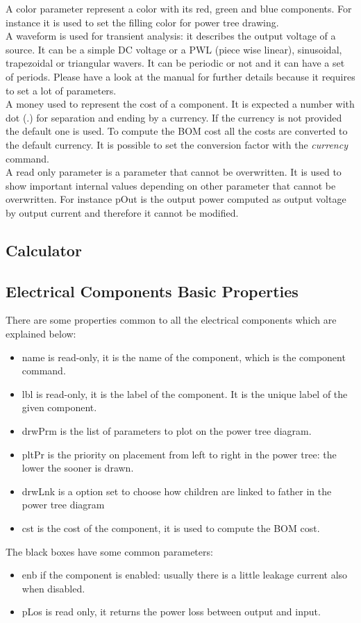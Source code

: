 \documentclass[12pt,a4paper]{book}
\begin{document}
A color parameter represent a color with its red, green and blue components. For instance it is used to set the filling color for power tree drawing.\\
A waveform is used for transient analysis: it describes the output voltage of a source. It can be a simple DC voltage or a PWL (piece wise linear), sinusoidal, trapezoidal or triangular wavers. It can be periodic or not and it can have a set of periods. Please have a look at the manual for further details because it requires to set a lot of parameters.\\
A money used to represent the cost of a component. It is expected a number with dot (.) for separation and ending by a currency. If the currency is not provided the default one is used. To compute the BOM cost all the costs are converted to the default currency. It is possible to set the conversion factor with the \emph{currency} command.\\
A read only parameter is a parameter that cannot be overwritten. It is used to show important internal values depending on other parameter that cannot be overwritten. For instance pOut is the output power computed as output voltage by output current and therefore it cannot be modified. 	\\
\subsection{Calculator}
\subsection{Electrical Components Basic Properties}
There are some properties common to all the electrical components which are explained below:\\
\begin{itemize}
\item name is read-only, it is the name of the component, which is the component command.
\item lbl is read-only, it is the label of the component. It is the unique label of the given component.
\item drwPrm is the list of parameters to plot on the power tree diagram.
\item pltPr is the priority on placement from left to right in the power tree: the lower the sooner is drawn.   
\item drwLnk is a option set to choose how children are linked to father in the power tree diagram
\item cst is the cost of the component, it is used to compute the BOM cost. 
\end{itemize}
The black boxes have some common parameters:
\begin{itemize}
\item enb if the component is enabled: usually there is a little leakage current also when disabled.
\item pLos is read only, it returns the power loss between output and input.
\end{itemize}
\end{document}
